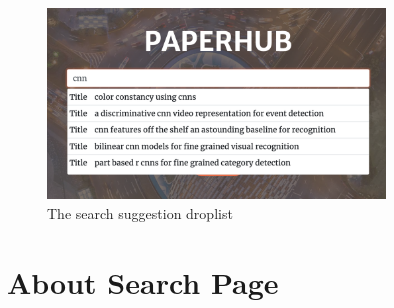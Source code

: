 \documentclass{article}
\begin{document}
	\begin{figure}[H]
		\begin{center}
			\includegraphics[width=0.80\textwidth]{zlf_3} %
			\caption{The search suggestion droplist}
		\end{center}
	\end{figure}
	\restoregeometry
	\section{About Search Page}
\end{document}
